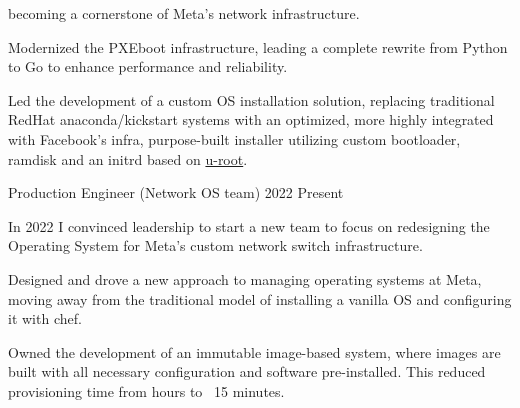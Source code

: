 \begin{cventries}
{\begin{cvitems}
{                  becoming a cornerstone of Meta's network infrastructure.}
      \item {Modernized the PXEboot infrastructure, leading a complete rewrite from Python
                  to Go to enhance performance and reliability.}
      \item {Led the development of a custom OS installation solution, replacing traditional RedHat
                  anaconda/kickstart systems with an optimized, more highly integrated with Facebook's infra, purpose-built installer utilizing custom bootloader, ramdisk and an initrd based on \href{https://github.com/u-root/u-root}{u-root}.}
    \end{cvitems}
  }

  \cventryprevrole
  {Production Engineer (Network OS team)}
  {2022 \newline Present}
  {
    In 2022 I convinced leadership to start a new team to focus on redesigning the Operating System for Meta's custom network switch infrastructure.
    \begin{cvitems}
      \item {Designed and drove a new approach to managing operating systems at Meta, moving away from the traditional model of installing a vanilla OS and configuring it with chef.}
      \item{Owned the development of an immutable image-based system, where images are built with all necessary configuration and software pre-installed. This reduced provisioning time from hours to ~15 minutes.}
    \end{cvitems}
  }


\end{cventries}
